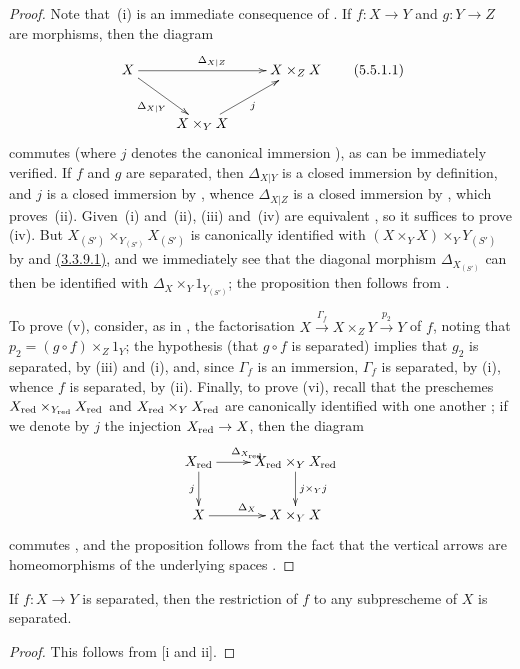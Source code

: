 \begin{proof}
Note that~(i) is an immediate consequence of .
If $f:X\to Y$ and $g:Y\to Z$ are morphisms, then the diagram
\[
\label{I.5.5.1.1}
  \xymatrix{
    X\ar[rr]^{\Delta_{X|Z}}\ar[dr]_{\Delta_{X|Y}} & &
    X\times_Z X\\
    & X\times_Y X\ar[ur]_j
  }
  \tag{5.5.1.1}
\]
commutes (where $j$ denotes the canonical immersion ), as can be immediately verified.
If $f$ and $g$ are separated, then $\Delta_{X|Y}$ is a closed immersion by definition, and $j$ is a closed immersion by , whence $\Delta_{X|Z}$ is a closed immersion by , which
proves~(ii).
Given~(i) and~(ii), (iii) and~(iv) are equivalent , so it suffices to prove (iv).
But $X_{(S')}\times_{Y_{(S')}}X_{(S')}$ is canonically identified with $(X\times_Y X)\times_Y Y_{(S')}$ by  and \hyperref[I.3.3.9]{(3.3.9.1)}, and we immediately see that the diagonal morphism $\Delta_{X_{(S')}}$ can then be identified with $\Delta_X\times_Y 1_{Y_{(S')}}$;
the proposition then follows from .

To prove (v), consider, as in , the factorisation $X\xrightarrow{\Gamma_f}X\times_Z Y\xrightarrow{p_2}Y$ of $f$, noting that $p_2=(g\circ f)\times_Z 1_Y$;
the hypothesis (that $g\circ f$ is separated) implies that $g_2$ is separated, by (iii) and (i), and, since $\Gamma_f$ is an immersion, $\Gamma_f$ is separated, by (i), whence $f$ is separated, by (ii).
Finally, to prove (vi), recall that the preschemes $X_{\mathrm{red}}\times_{Y_{\mathrm{red}}}X_{\mathrm{red}}$ and $X_{\mathrm{red}}\times_Y X_{\mathrm{red}}$ are canonically identified with one another ;
if we denote by $j$ the injection $X_\red\to X$, then the diagram
\[
  \xymatrix{
    X_\red\ar[r]^{\Delta_{X_\red}}\ar[d]_j &
    X_\red\times_Y X_\red\ar[d]^{j\times_Y j}\\
    X\ar[r]^{\Delta_X} &
    X\times_Y X
  }
\]
commutes , and the proposition follows from the fact that the vertical arrows are homeomorphisms of the underlying spaces .
\end{proof}

\begin{corollary}[5.5.2]
\label{I.5.5.2}
If $f:X\to Y$ is separated, then the restriction of $f$ to any subprescheme of $X$ is separated.
\end{corollary}

\begin{proof}
This follows from [i and ii].
\end{proof}


